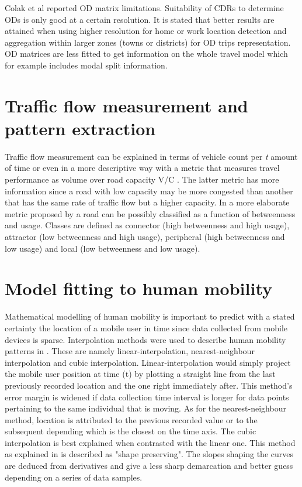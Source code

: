 \documentclass[12pt, a4paper]{report}
\theoremstyle{definition}
\theoremstyle{definition}%
\theoremstyle{definition}%
\theoremstyle{definition}%
\theoremstyle{definition}%
\theoremstyle{definition}%
\begin{document}
Colak et al reported OD matrix limitations. Suitability of CDRs to determine ODs is only good at a certain resolution. It is stated that better results are attained when using higher resolution for home or work location detection and aggregation within larger zones (towns or districts) for OD trips representation. OD matrices are less fitted to get information on the whole travel model which for example includes modal split information.


\section{Traffic flow measurement and pattern extraction}
Traffic flow measurement can be explained in terms of vehicle count per \textit{t} amount of time or even in a more descriptive way with a metric that measures travel performance as volume over road capacity V/C \cite{Toole2015}. The latter metric has more information since a road with low capacity may be more congested than another that has the same rate of traffic flow but a higher capacity. In a more elaborate metric proposed by \cite{Toole2015} a road can be possibly classified as a function of betweenness and usage. Classes are defined as connector (high betweenness and high usage), attractor (low betweenness and high usage), peripheral (high betweenness and low usage) and local (low betweenness and low usage).


\section{Model fitting to human mobility} \label{section:human_mobility_modelling}
Mathematical modelling of human mobility is important to predict with a stated certainty the location of a mobile user in time since data collected from mobile devices is sparse. Interpolation methods were used to describe human mobility patterns in \cite{Hoteit2014}. These are namely linear-interpolation, nearest-neighbour interpolation and cubic interpolation. Linear-interpolation would simply project the mobile user position at time (t) by plotting a straight line from the last previously recorded location and the one right immediately after. This method's error margin is widened if data collection time interval is longer for data points pertaining to the same individual that is moving. As for the nearest-neighbour method, location is attributed to the previous recorded value or to the subsequent depending which is the closest on the time axis. The cubic interpolation is best explained when contrasted with the linear one. This method as explained in \cite{Hoteit2014}  is described as "shape preserving". The slopes shaping the curves are deduced from derivatives and give a less sharp demarcation and better guess depending on a series of data samples.
\end{document}
